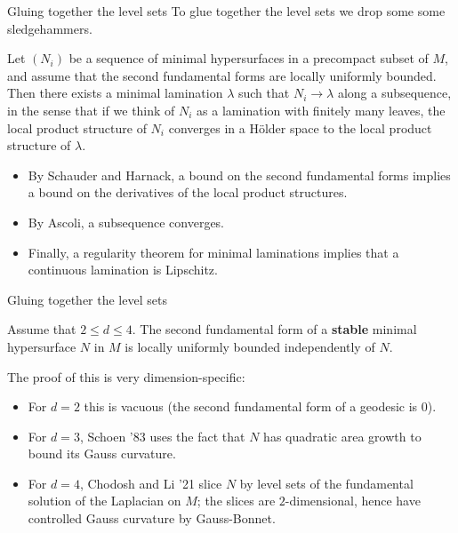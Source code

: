\documentclass[10pt]{beamer}
\begin{document}
\begin{frame}{Gluing together the level sets}
To glue together the level sets we drop some some sledgehammers.

\begin{theorem}
Let $(N_i)$ be a sequence of minimal hypersurfaces in a precompact subset of $M$, and assume that the second fundamental forms are locally uniformly bounded.
Then there exists a minimal lamination $\lambda$ such that $N_i \to \lambda$ along a subsequence, in the sense that if we think of $N_i$ as a lamination with finitely many leaves, the local product structure of $N_i$ converges in a H\"older space to the local product structure of $\lambda$.
\end{theorem}

\begin{itemize}
\item By Schauder and Harnack, a bound on the second fundamental forms implies a bound on the derivatives of the local product structures.
\item By Ascoli, a subsequence converges.
\item Finally, a regularity theorem for minimal laminations implies that a continuous lamination is Lipschitz.
\end{itemize}
\end{frame}

\begin{frame}{Gluing together the level sets}

\begin{theorem}
Assume that $2 \leq d \leq 4$.
The second fundamental form of a \textbf{stable} minimal hypersurface $N$ in $M$ is locally uniformly bounded independently of $N$.
\end{theorem}

The proof of this is very dimension-specific:
\begin{itemize}
\item For $d = 2$ this is vacuous (the second fundamental form of a geodesic is $0$).
\item For $d = 3$, Schoen '83 uses the fact that $N$ has quadratic area growth to bound its Gauss curvature.
\item For $d = 4$, Chodosh and Li '21 slice $N$ by level sets of the fundamental solution of the Laplacian on $M$; the slices are $2$-dimensional, hence have controlled Gauss curvature by Gauss-Bonnet.
\end{itemize}
\end{frame}
\end{document}
